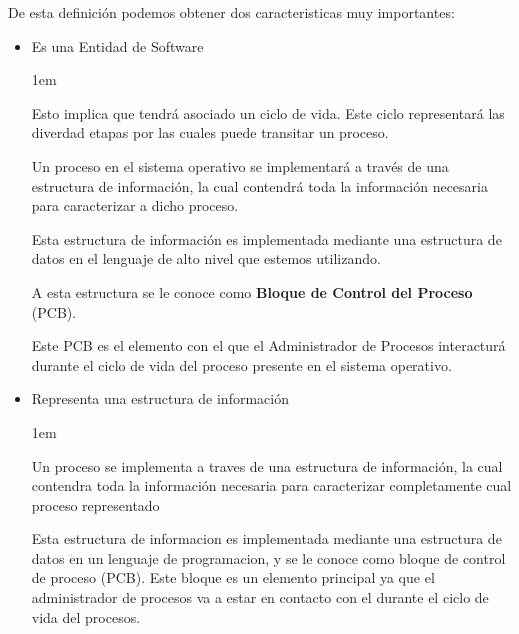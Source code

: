 \documentclass[12pt, fleqn]{report}                             %
\newenvironment{SmallIndentation}[1][0.75em]                    %
    {\begin{adjustwidth}{#1}{}\begin{footnotesize}}                 %
    {\end{footnotesize}\end{adjustwidth}}                           %
\begin{document}
            De esta definición podemos obtener dos caracteristicas muy importantes:
            \begin{itemize}
                
                \item Es una Entidad de Software

                    \begin{SmallIndentation}[1em]
                        Esto implica que tendrá asociado un ciclo de vida. Este ciclo representará
                        las diverdad etapas por las cuales puede transitar un proceso.

                        Un proceso en el sistema operativo se implementará a través de una
                        estructura de información, la cual contendrá toda la información necesaria
                        para caracterizar a dicho proceso.

                        Esta estructura de información es implementada mediante una
                        estructura de datos en el lenguaje de alto nivel que estemos utilizando.

                        A esta estructura se le conoce como \textbf{Bloque de Control del Proceso}
                        (PCB). 

                        Este PCB es el elemento con el que el Administrador de Procesos
                        interacturá durante el ciclo de vida del proceso presente en el sistema 
                        operativo.
                    \end{SmallIndentation}

                \item Representa una estructura de información

                    \begin{SmallIndentation}[1em]
                        Un proceso se implementa a traves de una estructura de información, la cual contendra
                        toda la información necesaria para caracterizar completamente cual proceso representado

                        Esta estructura de informacion es implementada mediante una estructura de datos en un
                        lenguaje de programacion, y se le conoce como bloque de control de proceso (PCB).
                        Este bloque es un elemento principal ya que el administrador de procesos va a estar
                        en contacto con el durante el ciclo de vida del procesos.
                    
                    \end{SmallIndentation}
                        
            \end{itemize}
\end{document}
